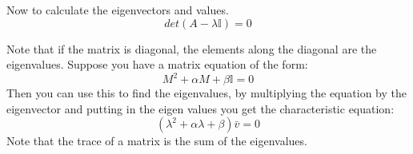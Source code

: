 \documentclass{article}
\begin{document}
{Now to calculate the eigenvectors and values. 
\begin{equation}
det(A-\lambda\mathbb{I})=0
\end{equation}

Note that if the matrix is diagonal, the elements along the diagonal are the eigenvalues. Suppose you have a matrix equation of the form:
\begin{equation}
M^2+\alpha M+\beta \mathbb{I}=0
\end{equation}
Then you can use this to find the eigenvalues, by multiplying the equation by the eigenvector and putting in the eigen values you get the characteristic equation:
\begin{equation}
(\lambda^2+\alpha\lambda+\beta)\bar{v}=0
\end{equation}
Note that the trace of a matrix is the sum of the eigenvalues. 

}
\end{document}
